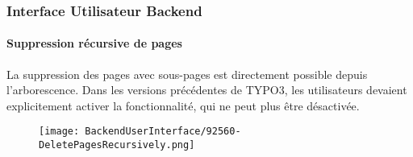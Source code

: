 %

\begin{frame}[fragile]
	\frametitle{Interface Utilisateur Backend}
	\framesubtitle{Suppression récursive de pages}

	La suppression des pages avec sous-pages est directement possible depuis l'arborescence.
	Dans les versions précédentes de TYPO3, les utilisateurs devaient explicitement activer
	la fonctionnalité, qui ne peut plus être désactivée.

	\begin{figure}
		\texttt{[image: BackendUserInterface/92560-DeletePagesRecursively.png]}
	\end{figure}

\end{frame}

